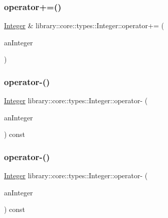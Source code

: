 \subsubsection{\texorpdfstring{operator+=()}{operator+=()}\hspace{0.1cm}{\footnotesize\ttfamily [2/2]}}
{\footnotesize\ttfamily \hyperlink{classlibrary_1_1core_1_1types_1_1_integer}{Integer} \& library\+::core\+::types\+::\+Integer\+::operator+= (\begin{DoxyParamCaption}\item[{const \hyperlink{classlibrary_1_1core_1_1types_1_1_integer_a623afb1580f870fd8a1997b1c12c917d}{Integer\+::\+Value\+Type} \&}]{an\+Integer }\end{DoxyParamCaption})}

\mbox{\label{classlibrary_1_1core_1_1types_1_1_integer_a728dd9f86ee7d512787f2024a7194913}} 
\subsubsection{\texorpdfstring{operator-\/()}{operator-()}\hspace{0.1cm}{\footnotesize\ttfamily [1/4]}}
{\footnotesize\ttfamily \hyperlink{classlibrary_1_1core_1_1types_1_1_integer}{Integer} library\+::core\+::types\+::\+Integer\+::operator-\/ (\begin{DoxyParamCaption}\item[{const \hyperlink{classlibrary_1_1core_1_1types_1_1_integer}{Integer} \&}]{an\+Integer }\end{DoxyParamCaption}) const}

\mbox{\label{classlibrary_1_1core_1_1types_1_1_integer_a7bbe7f9e02df0f4d64df023552c109e2}} 
\subsubsection{\texorpdfstring{operator-\/()}{operator-()}\hspace{0.1cm}{\footnotesize\ttfamily [2/4]}}
{\footnotesize\ttfamily \hyperlink{classlibrary_1_1core_1_1types_1_1_integer}{Integer} library\+::core\+::types\+::\+Integer\+::operator-\/ (\begin{DoxyParamCaption}\item[{const \hyperlink{classlibrary_1_1core_1_1types_1_1_integer_a623afb1580f870fd8a1997b1c12c917d}{Integer\+::\+Value\+Type} \&}]{an\+Integer }\end{DoxyParamCaption}) const}

